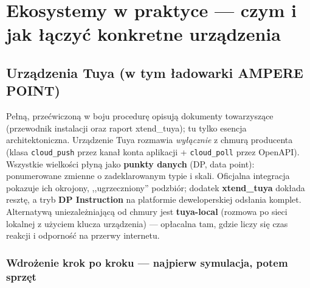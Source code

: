 \documentclass[11pt,a4paper]{article}
\begin{document}
\begin{center}
\end{center}

\section{Ekosystemy w praktyce --- czym i jak łączyć konkretne urządzenia}
\label{sec:ekosystemy}

\subsection{Urządzenia Tuya (w tym ładowarki AMPERE POINT)}

Pełną, przećwiczoną w boju procedurę opisują dokumenty towarzyszące (przewodnik instalacji oraz raport xtend\_tuya); tu tylko esencja architektoniczna. Urządzenie Tuya rozmawia \emph{wyłącznie} z chmurą producenta (klasa \texttt{cloud\_push} przez kanał konta aplikacji + \texttt{cloud\_poll} przez OpenAPI). Wszystkie wielkości płyną jako \textbf{punkty danych} (DP, data point): ponumerowane zmienne o zadeklarowanym typie i skali. Oficjalna integracja pokazuje ich okrojony, ,,ugrzeczniony'' podzbiór; dodatek \textbf{xtend\_tuya} dokłada resztę, a tryb \textbf{DP Instruction} na platformie deweloperskiej odsłania komplet. Alternatywą uniezależniającą od chmury jest \textbf{tuya-local} (rozmowa po sieci lokalnej z użyciem klucza urządzenia) --- opłacalna tam, gdzie liczy się czas reakcji i odporność na przerwy internetu. 

\subsubsection{Wdrożenie krok po kroku --- najpierw symulacja, potem sprzęt}
\end{document}
